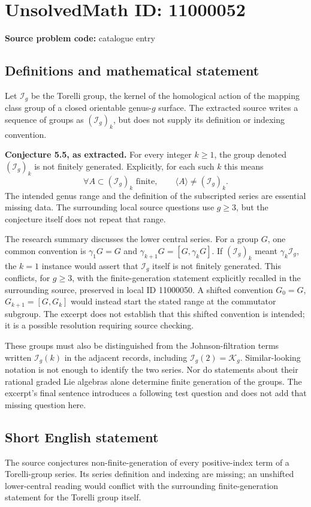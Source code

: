 \documentclass[11pt]{article}
\begin{document}
\section*{UnsolvedMath ID: 11000052}
\textbf{Source problem code:} catalogue entry
\subsection{Definitions and mathematical statement}
Let $\mathcal I_g$ be the Torelli group, the kernel of the homological action of the mapping class group of a closed orientable genus-$g$ surface. The extracted source writes a sequence of groups as $(\mathcal I_g)_k$, but does not supply its definition or indexing convention.

\textbf{Conjecture 5.5, as extracted.} For every integer $k\ge1$, the group denoted $(\mathcal I_g)_k$ is not finitely generated. Explicitly, for each such $k$ this means
\[
 \forall A\subset(\mathcal I_g)_k\text{ finite},\qquad
 \langle A\rangle\ne(\mathcal I_g)_k.
\]
The intended genus range and the definition of the subscripted series are essential missing data. The surrounding local source questions use $g\ge3$, but the conjecture itself does not repeat that range.

The research summary discusses the lower central series. For a group $G$, one common convention is $\gamma_1G=G$ and $\gamma_{k+1}G=[G,\gamma_kG]$. If $(\mathcal I_g)_k$ meant $\gamma_k\mathcal I_g$, the $k=1$ instance would assert that $\mathcal I_g$ itself is not finitely generated. This conflicts, for $g\ge3$, with the finite-generation statement explicitly recalled in the surrounding source, preserved in local ID 11000050. A shifted convention $G_0=G$, $G_{k+1}=[G,G_k]$ would instead start the stated range at the commutator subgroup. The excerpt does not establish that this shifted convention is intended; it is a possible resolution requiring source checking.

These groups must also be distinguished from the Johnson-filtration terms written $\mathcal I_g(k)$ in the adjacent records, including $\mathcal I_g(2)=\mathcal K_g$. Similar-looking notation is not enough to identify the two series. Nor do statements about their rational graded Lie algebras alone determine finite generation of the groups. The excerpt's final sentence introduces a following test question and does not add that missing question here.
\subsection{Short English statement}
The source conjectures non-finite-generation of every positive-index term of a Torelli-group series. Its series definition and indexing are missing; an unshifted lower-central reading would conflict with the surrounding finite-generation statement for the Torelli group itself.
\end{document}
